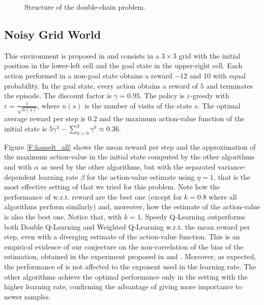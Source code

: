 \documentclass[conference]{IEEEtran}
\begin{document}
\begin{figure}[t]
\begin{center}
\end{center}
\caption{Structure of the double-chain problem.}
\label{F:double-chain}
\end{figure}

\subsection{Noisy Grid World}
This environment is proposed in \cite{van2010double} and consists in a $3 \times 3$ grid with the initial position in the lower-left cell and the goal state in the upper-right cell. Each action performed in a non-goal state obtains a reward $-12$ and $10$ with equal probability. In the goal state, every action obtains a reward of $5$ and terminates the episode. The discount factor is $\gamma = 0.95$. The policy is $\varepsilon$-greedy with $\varepsilon = \frac{1}{\sqrt{n(s)}}$, where $n(s)$ is the number of  visits of the state $s$. The optimal average reward per step is $0.2$ and the maximum action-value function of the initial state is $5\gamma^4 - \sum_{k=0}^3 \gamma^k \approx 0.36$.

Figure \ref{F:hasselt_all} shows the mean reward per step and the approximation of the maximum action-value in the initial state computed by the other algorithms and \alg with $\alpha$ as used by the other algorithms, but with the separated variance-dependent learning rate $\beta$ for the action-value estimate using $\eta = 1$, that is the most effective setting of \alg that we tried for this problem. Note how the performance of \alg w.r.t. reward are the best one (except for $k=0.8$ where all algorithms perform similarly) and, moreover, how the estimate of the action-value is also the best one. Notice that, with $k=1$, Speedy Q-Learning outperforms both Double Q-Learning and Weighted Q-Learning w.r.t. the mean reward per step, even with a diverging estimate of the action-value function. This is an empirical evidence of our conjecture on the non-correlation of the bias of the estimation, obtained in the experiment proposed in \cite{van2010double} and \cite{d2016estimating}. Moreover, as expected, the performance of \alg is not affected to the exponent used in the learning rate. The other algorithms achieve the optimal performance only in the setting with the higher learning rate, confirming the advantage of giving more importance to newer samples.
\end{document}
